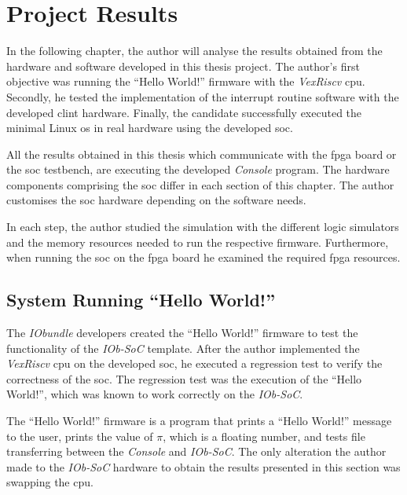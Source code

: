\chapter{Project Results}
\label{chapter:project_results}
In the following chapter, the author will analyse the results obtained from the hardware and software developed in this thesis project. The author's first objective was running the \enquote{Hello World!} firmware with the \textit{VexRiscv} \acrshort{cpu}. Secondly, he tested the implementation of the interrupt routine software with the developed \acrshort{clint} hardware. Finally, the candidate successfully executed the minimal Linux \acrshort{os} in real hardware using the developed \acrlong{soc}.

All the results obtained in this thesis which communicate with the \acrshort{fpga} board or the \acrshort{soc} testbench, are executing the developed \textit{Console} program. The hardware components comprising the \acrshort{soc} differ in each section of this chapter. The author customises the \acrshort{soc} hardware depending on the software needs.

In each step, the author studied the simulation with the different logic simulators and the memory resources needed to run the respective firmware. Furthermore, when running the \acrshort{soc} on the \acrshort{fpga} board he examined the required \acrshort{fpga} resources.

\section{System Running \enquote{Hello World!}}
\label{section:hello_world}
The \textit{IObundle} developers created the \enquote{Hello World!} firmware to test the functionality of the \textit{IOb-SoC} template. After the author implemented the \textit{VexRiscv} \acrshort{cpu} on the developed \acrshort{soc}, he executed a regression test to verify the correctness of the \acrshort{soc}. The regression test was the execution of the \enquote{Hello World!}, which was known to work correctly on the \textit{IOb-SoC}.

The \enquote{Hello World!} firmware is a program that prints a \enquote{Hello World!} message to the user, prints the value of $\pi$, which is a floating number, and tests file transferring between the \textit{Console} and \textit{IOb-SoC}. The only alteration the author made to the \textit{IOb-SoC} hardware to obtain the results presented in this section was swapping the \acrshort{cpu}.

